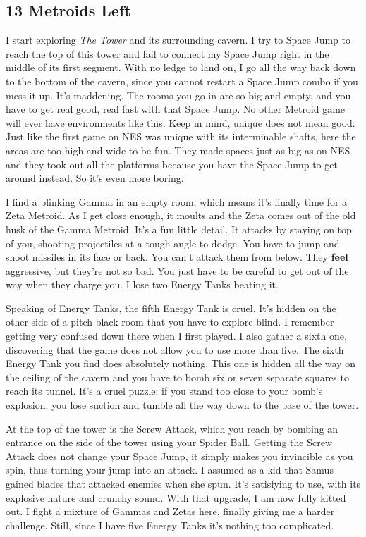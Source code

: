 \documentclass{book}
\begin{document}
\subsection*{13 Metroids Left}\nopagebreak[4]

I start exploring \emph{The Tower} and its surrounding cavern. I try to Space Jump to reach the top of this tower and fail to connect my Space Jump right in the middle of its first segment. With no ledge to land on, I go all the way back down to the bottom of the cavern, since you cannot restart a Space Jump combo if you mess it up. It’s maddening. The rooms you go in are so big and empty, and you have to get real good, real fast with that Space Jump. No other Metroid game will ever have environments like this. Keep in mind, unique does not mean good. Just like the first game on NES was unique with its interminable shafts, here the areas are too high and wide to be fun. They made spaces just as big as on NES and they took out all the platforms because you have the Space Jump to get around instead. So it’s even more boring.

I find a blinking Gamma in an empty room, which means it’s finally time for a Zeta Metroid. As I get close enough, it moults and the Zeta comes out of the old husk of the Gamma Metroid. It’s a fun little detail. It attacks by staying on top of you, shooting projectiles at a tough angle to dodge. You have to jump and shoot missiles in its face or back. You can’t attack them from below. They \textbf{feel} aggressive, but they’re not so bad. You just have to be careful to get out of the way when they charge you. I lose two Energy Tanks beating it.

Speaking of Energy Tanks, the fifth Energy Tank is cruel. It’s hidden on the other side of a pitch black room that you have to explore blind. I remember getting very confused down there when I first played. I also gather a sixth one, discovering that the game does not allow you to use more than five. The sixth Energy Tank you find does absolutely nothing. This one is hidden all the way on the ceiling of the cavern and you have to bomb six or seven separate squares to reach its tunnel. It’s a cruel puzzle; if you stand too close to your bomb’s explosion, you lose suction and tumble all the way down to the base of the tower.

At the top of the tower is the Screw Attack, which you reach by bombing an entrance on the side of the tower using your Spider Ball. Getting the Screw Attack does not change your Space Jump, it simply makes you invincible as you spin, thus turning your jump into an attack. I assumed as a kid that Samus gained blades that attacked enemies when she spun. It’s satisfying to use, with its explosive nature and crunchy sound. With that upgrade, I am now fully kitted out. I fight a mixture of Gammas and Zetas here, finally giving me a harder challenge. Still, since I have five Energy Tanks it’s nothing too complicated.
\end{document}
